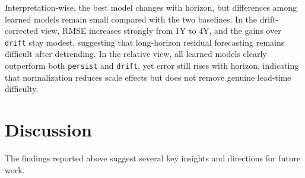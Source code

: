 \documentclass[pdflatex,sn-basic]{sn-jnl}
\begin{document}
\begin{table}[htbp]
\centering
\caption{Horizon comparison (RMSE) across two target views: drift-corrected residuals (\texttt{TARGET\_MODE=drift\_residual}) and smoothed relative levels (\texttt{TARGET\_MODE=smooth\_relative}). Models were retrained for each horizon (\(1\)Y to \(4\)Y). Best score in each column is in bold.}
\label{tab:horizon_combined}
\end{table}

Interpretation-wise, the best model changes with horizon, but differences among learned models remain small compared with the two baselines. In the drift-corrected view, RMSE increases strongly from 1Y to 4Y, and the gains over \texttt{drift} stay modest, suggesting that long-horizon residual forecasting remains difficult after detrending. In the relative view, all learned models clearly outperform both \texttt{persist} and \texttt{drift}, yet error still rises with horizon, indicating that normalization reduces scale effects but does not remove genuine lead-time difficulty.

\newpage
\section{Discussion}
The findings reported above suggest several key insights and directions for future work.
\end{document}
